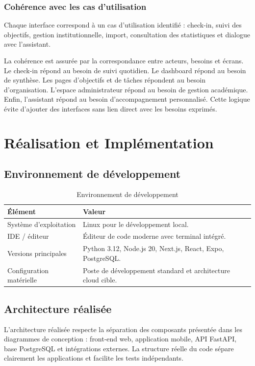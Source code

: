 \documentclass{rapportENSET}
\begin{document}
\subsubsection*{Cohérence avec les cas d'utilisation}
Chaque interface correspond à un cas d'utilisation identifié : check-in, suivi des objectifs, gestion institutionnelle, import, consultation des statistiques et dialogue avec l'assistant.

La cohérence est assurée par la correspondance entre acteurs, besoins et écrans. Le check-in répond au besoin de suivi quotidien. Le dashboard répond au besoin de synthèse. Les pages d'objectifs et de tâches répondent au besoin d'organisation. L'espace administrateur répond au besoin de gestion académique. Enfin, l'assistant répond au besoin d'accompagnement personnalisé. Cette logique évite d'ajouter des interfaces sans lien direct avec les besoins exprimés.


\section{Réalisation et Implémentation}
\subsection{Environnement de développement}
\begin{table}[H]
\centering
\begin{tabularx}{\textwidth}{@{}L{0.28\textwidth}Y@{}}
\toprule
\textbf{Élément} & \textbf{Valeur} \\
\midrule
Système d'exploitation & Linux pour le développement local. \\
IDE / éditeur & Éditeur de code moderne avec terminal intégré. \\
Versions principales & Python 3.12, Node.js 20, Next.js, React, Expo, PostgreSQL. \\
Configuration matérielle & Poste de développement standard et architecture cloud cible. \\
\bottomrule
\end{tabularx}
\caption{Environnement de développement}
\end{table}

\subsection{Architecture réalisée}
L'architecture réalisée respecte la séparation des composants présentée dans les diagrammes de conception : front-end web, application mobile, API FastAPI, base PostgreSQL et intégrations externes. La structure réelle du code sépare clairement les applications et facilite les tests indépendants.
\end{document}
